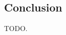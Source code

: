 \documentclass[a4paper,10pt]{article}
\begin{document}
\begin{multicols}{2}
\section{Conclusion}

TODO.







\end{multicols}
\end{document}
